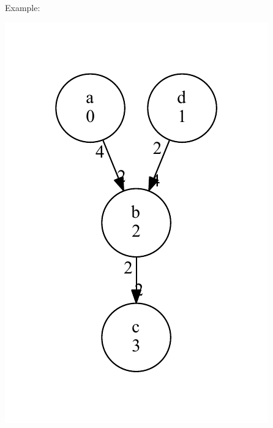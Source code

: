 Example\+: 
\begin{DoxyImage}
\includegraphics[width=\textwidth,height=\textheight/2,keepaspectratio=true]{dot_SDFG_example}
\end{DoxyImage}
 
